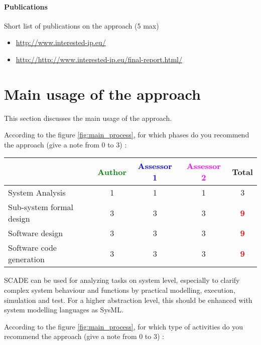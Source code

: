 \paragraph{Publications} Short list of publications on the approach (5 max)

\begin{itemize}
	\item \url{http://www.interested-ip.eu/}
  \item \url{http://http://www.interested-ip.eu/final-report.html/}

\end{itemize}

\section{Main usage of the approach}
\label{main_usage}
This section discusses the main usage of the approach.

According to the figure \ref{fig:main_process}, for which phases do you recommend the approach (give a note from 0 to  3) :

\begin{tabular}{|l | c | c | c | c|}
\hline
& \textcolor{green}{Author} & \textcolor{blue}{Assessor 1} & \textcolor{magenta}{Assessor 2} & Total \\
\hline 
System Analysis & 1      & 1     &1 & 3     \\
\hline
Sub-system  formal  design &  3 & 3     &3 & \textcolor{red}{\textbf{9}} \\
\hline
Software design & 3      & 3     & 3     & \textcolor{red}{\textbf{9}} \\
\hline
Software code generation & 3     & 3     &3 & \textcolor{red}{\textbf{9}} \\
\hline
\end{tabular}

\begin{author_comment}
SCADE can be used for analyzing tasks on system level, especially to clarify complex system behaviour and functions by practical modelling, execution, simulation and test. For a higher abstraction level, this should be enhanced with system modelling languages as SysML.
\end{author_comment}
According to the figure \ref{fig:main_process}, for which type of activities do you recommend the approach (give a note from 0 to  3) :

